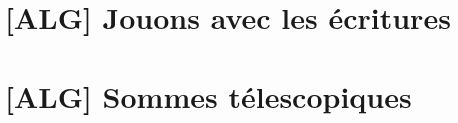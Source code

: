 \section{[ALG] Jouons avec les écritures} \label{power-2:rewriting}

	


\newpage
\section{[ALG] Sommes télescopiques} \label{power-2:telescopic}

	
